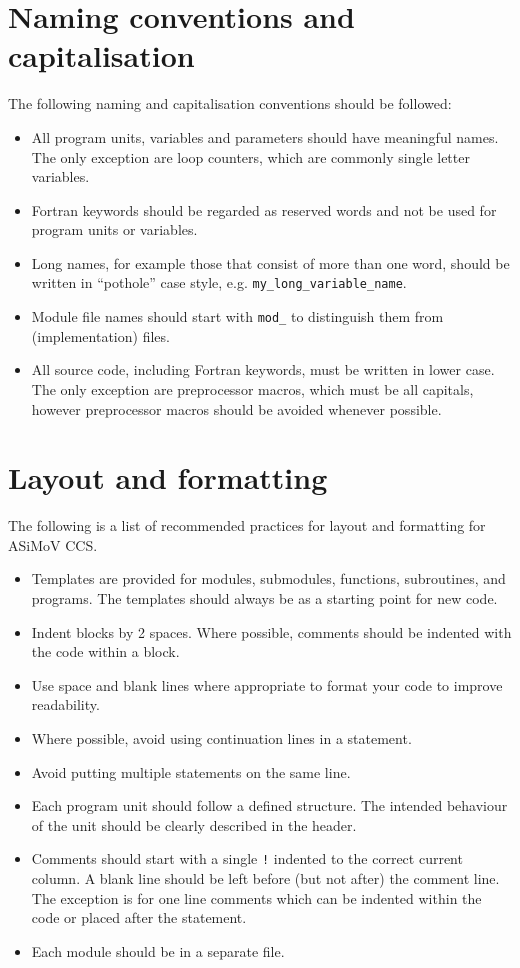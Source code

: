 \documentclass[11pt]{article}
\begin{document}
\section{Naming conventions and capitalisation}
The following naming and capitalisation conventions should be followed:
\begin{itemize}
  \item All program units, variables and parameters should have meaningful names. The only exception are loop counters, which
  are commonly single letter variables.
  \item Fortran keywords should be regarded as reserved words and not be used for program units or variables.
  \item Long names, for example those that consist of more than one word, 
  should be written in ``pothole'' case style, e.g. \texttt{my\_long\_variable\_name}.
  \item Module file names should start with \texttt{mod\_} to distinguish them from (implementation) files.
  \item All source code, including Fortran keywords, must be written in lower case. The only exception are preprocessor 
  macros, which must be all capitals, however preprocessor macros should be avoided whenever possible.
\end{itemize}

\section{Layout and formatting}
The following is a list of recommended practices for layout and formatting for ASiMoV CCS.

\begin{itemize}
\item Templates are provided for modules, submodules, functions, subroutines, and programs. The templates should always be as a 
starting point for new code.
\item Indent blocks by 2 spaces. Where possible, comments should be indented with the code within a block.
\item Use space and blank lines where appropriate to format your code to improve readability.
\item Where possible, avoid using continuation lines in a statement.
\item Avoid putting multiple statements on the same line.
\item Each program unit should follow a defined structure. The intended behaviour of the unit should be clearly described in the header.
\item Comments should start with a single \texttt{!} indented to the correct current column. A blank line should be left before (but not after) the 
comment line. The exception is for one line comments which can be indented within the code or placed after the statement.
\item Each module should be in a separate file.
\end{itemize}
\end{document}
